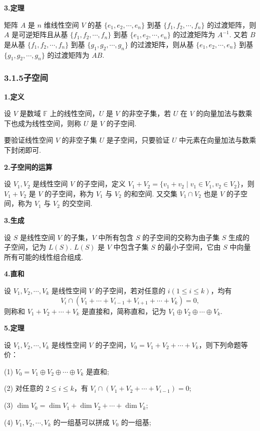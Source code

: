 \documentclass[UTF8,12pt,a4paper,fontset=fandol]{ctexart}
\begin{document}
\noindent\textbf{3.\quad 定理}

矩阵 $A$ 是 $n$ 维线性空间 $V$ 的基 $\{e_1,e_2,\cdots,e_n\}$ 到基 $\{f_1,f_2,\cdots,f_n\}$ 的过渡矩阵，则 $A$ 是可逆矩阵且从基 $\{f_1,f_2,\cdots,f_n\}$ 到基 $\{e_1,e_2,\cdots,e_n\}$ 的过渡矩阵为 $A^{-1}$. 又若 $B$ 是从基 $\{f_1,f_2,\cdots,f_n\}$ 到基 $\{g_1,g_2,\cdots,g_n\}$ 的过渡矩阵，则从基 $\{e_1,e_2,\cdots,e_n\}$ 到基 $\{g_1,g_2,\cdots,g_n\}$ 的过渡矩阵为 $AB$.

\subsubsection*{3.1.5\quad 子空间}

\noindent\textbf{1.\quad 定义}

设 $V$ 是数域 $\mathbb{F}$ 上的线性空间，$U$ 是 $V$ 的非空子集，若 $U$ 在 $V$ 的向量加法与数乘下也成为线性空间，则称 $U$ 是 $V$ 的子空间.

要验证线性空间 $V$ 的非空子集 $U$ 是子空间，只要验证 $U$ 中元素在向量加法与数乘下封闭即可.

\noindent\textbf{2.\quad 子空间的运算}

设 $V_1,V_2$ 是线性空间 $V$ 的子空间，定义 $V_1+V_2=\{v_1+v_2\mid v_1\in V_1,v_2\in V_2\}$，则 $V_1+V_2$ 是 $V$ 的子空间，称为 $V_1$ 与 $V_2$ 的和空间. 又交集 $V_1\cap V_2$ 也是 $V$ 的子空间，称为 $V_1$ 与 $V_2$ 的交空间.

\noindent\textbf{3.\quad 生成}

设 $S$ 是线性空间 $V$ 的子集，$V$ 中所有包含 $S$ 的子空间的交称为由子集 $S$ 生成的子空间，记为 $L(S)$. $L(S)$ 是 $V$ 中包含子集 $S$ 的最小子空间，它由 $S$ 中向量所有可能的线性组合组成.

\noindent\textbf{4.\quad 直和}

设 $V_1,V_2,\cdots,V_k$ 是线性空间 $V$ 的子空间，若对任意的 $i(1\le i\le k)$，均有
\[
V_i\cap(V_1+\cdots+V_{i-1}+V_{i+1}+\cdots+V_k)=0,
\]
则称和 $V_1+V_2+\cdots+V_k$ 是直接和，简称直和，记为 $V_1\oplus V_2\oplus\cdots\oplus V_k$.

\noindent\textbf{5.\quad 定理}

设 $V_1,V_2,\cdots,V_k$ 是线性空间 $V$ 的子空间，$V_0=V_1+V_2+\cdots+V_k$，则下列命题等价：

(1) $V_0=V_1\oplus V_2\oplus\cdots\oplus V_k$ 是直和;

(2) 对任意的 $2\le i\le k$，有 $V_i\cap(V_1+V_2+\cdots+V_{i-1})=0$;

(3) $\dim V_0=\dim V_1+\dim V_2+\cdots+\dim V_k$;

(4) $V_1,V_2,\cdots,V_k$ 的一组基可以拼成 $V_0$ 的一组基;
\end{document}
